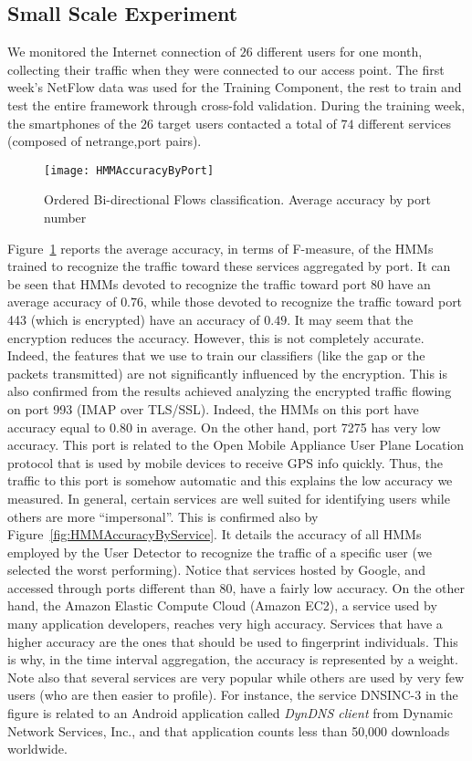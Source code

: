 \documentclass[10pt,conference,compsocconf,letterpaper]{IEEEtran}
\begin{document}
\subsection{Small Scale Experiment}
\label{sec:results}
We monitored the Internet connection of $26$ different users for one month,
collecting their traffic when they were connected to our access
point. The first week's NetFlow data was used for the Training Component, the rest to train and test the entire framework through cross-fold validation. During the training week, the smartphones of the $26$ target users contacted a total of $74$ different services (composed of netrange,port pairs). 
\begin{figure}[t]	
    \centering    
    \texttt{[image: HMMAccuracyByPort]}
    \caption{Ordered Bi-directional Flows classification. Average accuracy by port number}
\label{fig:HMMAccuracyByPort}
\end{figure}
Figure~\ref{fig:HMMAccuracyByPort} reports the average accuracy, in terms of F-measure, of the HMMs trained to recognize the traffic toward these services aggregated by port.
It can be seen that HMMs devoted to recognize the traffic toward port 80 have an average accuracy of $0.76$, while those devoted to recognize the traffic toward  port 443 (which is encrypted) have an accuracy of $0.49$. 
It may seem that the encryption reduces the accuracy. However, this is not completely accurate. Indeed, the features that we use to train our classifiers (like the gap or the packets transmitted) are not significantly influenced by the encryption. This is also confirmed from the results achieved analyzing the encrypted traffic flowing on port 993 (IMAP over TLS/SSL). 
Indeed, the HMMs on this port have accuracy equal to $0.80$ in average. 
On the other hand, port 7275 has very low accuracy. This port is related to the Open Mobile Appliance User Plane Location protocol that is used by mobile devices to receive GPS info quickly. Thus, the traffic to this port is somehow 
automatic and this explains the low accuracy we measured. 
In general, certain services are well suited for identifying users  while others are more ``impersonal''. This is confirmed also by Figure~\ref{fig:HMMAccuracyByService}. It details the accuracy of all HMMs employed by the User Detector to recognize the traffic of a specific user (we selected the worst performing). 
Notice that services hosted by Google, and accessed through ports different than $80$, have a fairly low accuracy. On the other hand, the Amazon Elastic Compute Cloud (Amazon EC2), a service used by many application developers, reaches very high accuracy. 
Services that have a higher accuracy are the ones that should be used to fingerprint individuals. This is why, in the time interval aggregation, the accuracy is represented by a weight. 
Note also that several services are very popular while others are used by very few users (who are then easier to profile). For instance, the service DNSINC-3 in the figure is related to an Android application called \emph{DynDNS client} from Dynamic Network Services, Inc., and that application counts less than 50,000 downloads worldwide. 
\end{document}

